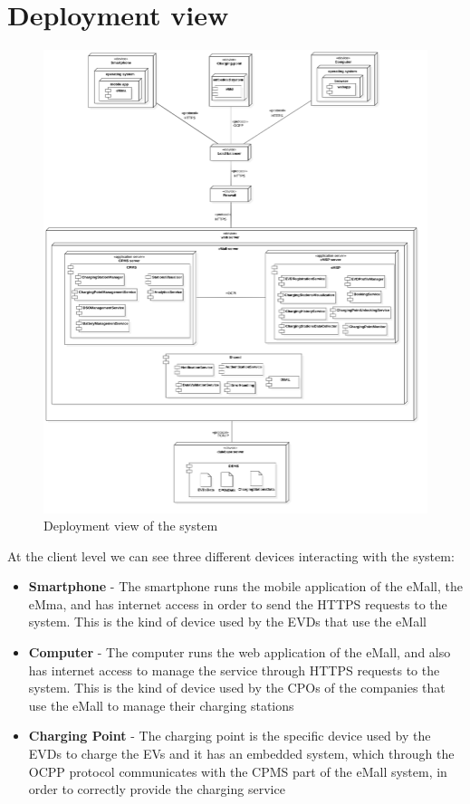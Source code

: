 \section{Deployment view}
\begin{figure}[H]
    \centering
    \includegraphics[width=1\textwidth, height=0.9\textheight]{Images/cp2/DeploymentDiagram.png}
    \caption{Deployment view of the system}
\end{figure}
At the client level we can see three different devices interacting with the system:
\begin{itemize}
    \item \textbf{Smartphone} - The smartphone runs the mobile application of the eMall, the eMma, and has internet access in order to send the HTTPS requests to the system. This is the kind of device used by the EVDs that use the eMall
    \item \textbf{Computer} - The computer runs the web application of the eMall, and also has internet access to manage the service through HTTPS requests to the system. This is the kind of device used by the CPOs of the companies that use the eMall to manage their charging stations
    \item \textbf{Charging Point} - The charging point is the specific device used by the EVDs to charge the EVs and it has an embedded system, which through the OCPP protocol communicates with the CPMS part of the eMall system, in order to correctly provide the charging service
\end{itemize}

